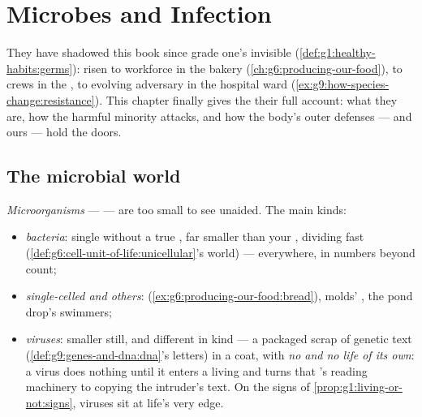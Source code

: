 \chapter{Microbes and Infection}\label{ch:g9:microbes-and-infection}

They have shadowed this book since grade one's invisible
 (\cref{def:g1:healthy-habits:germs}): risen to
workforce in the bakery
(\cref{ch:g6:producing-our-food}), to  crews in
the , to evolving adversary in the hospital ward
(\cref{ex:g9:how-species-change:resistance}). This chapter
finally gives the  their full account: what they
are, how the harmful minority attacks, and how the body's
outer defenses --- and ours --- hold the doors.

\section{The microbial world}

\begin{definition}\label{def:g9:microbes-and-infection:sorted}
\emph{Microorganisms} ---  ---
are  too small to see unaided. The main
kinds:
\begin{itemize}
  \item \emph{bacteria}: single 
        without a true , far smaller than your
        , dividing fast
        (\cref{def:g6:cell-unit-of-life:unicellular}'s
        world) --- everywhere, in numbers beyond count;
  \item \emph{single-celled  and others}: 
        (\cref{ex:g6:producing-our-food:bread}), molds'
        , the pond drop's swimmers;
  \item \emph{viruses}: smaller still, and
        different in kind --- a packaged scrap of genetic
        text (\cref{def:g9:genes-and-dna:dna}'s letters)
        in a coat, with \emph{no  and no life of its
        own}: a virus does nothing until it enters a
        living  and turns that 's reading
        machinery to copying the intruder's text. On the
        signs of \cref{prop:g1:living-or-not:signs},
        viruses sit at life's very edge.
\end{itemize}
\end{definition}

